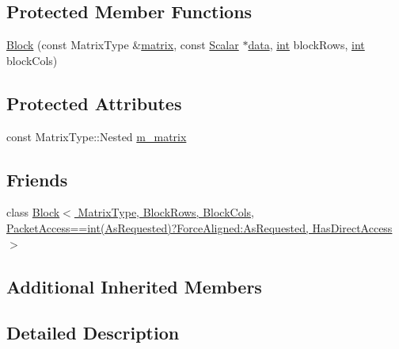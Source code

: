 \subsection*{Protected Member Functions}
\begin{DoxyCompactItemize}
\item 
\hyperlink{class_block_3_01_matrix_type_00_01_block_rows_00_01_block_cols_00_01_packet_access_00_01_has_direct_access_01_4_a58ff057db90188f88a4ba8dc6c062c35}{Block} (const Matrix\-Type \&\hyperlink{glext_8h_a7b24a3f2f56eb1244ae69dacb4fecb6f}{matrix}, const \hyperlink{class_map_base_abda8b790105e1c385696bfa2fe7b9c12}{Scalar} $\ast$\hyperlink{glext_8h_a8850df0785e6fbcc2351af3b686b8c7a}{data}, \hyperlink{ioapi_8h_a787fa3cf048117ba7123753c1e74fcd6}{int} block\-Rows, \hyperlink{ioapi_8h_a787fa3cf048117ba7123753c1e74fcd6}{int} block\-Cols)
\end{DoxyCompactItemize}
\subsection*{Protected Attributes}
\begin{DoxyCompactItemize}
\item 
const Matrix\-Type\-::\-Nested \hyperlink{class_block_3_01_matrix_type_00_01_block_rows_00_01_block_cols_00_01_packet_access_00_01_has_direct_access_01_4_afb211a50d07860391765ce11156a767e}{m\-\_\-matrix}
\end{DoxyCompactItemize}
\subsection*{Friends}
\begin{DoxyCompactItemize}
\item 
class \hyperlink{class_block_3_01_matrix_type_00_01_block_rows_00_01_block_cols_00_01_packet_access_00_01_has_direct_access_01_4_a2918cdd89aced85b68c9d0bc5728bea1}{Block$<$ Matrix\-Type, Block\-Rows, Block\-Cols, Packet\-Access==int(\-As\-Requested)?\-Force\-Aligned\-:\-As\-Requested, Has\-Direct\-Access $>$}
\end{DoxyCompactItemize}
\subsection*{Additional Inherited Members}


\subsection{Detailed Description}
